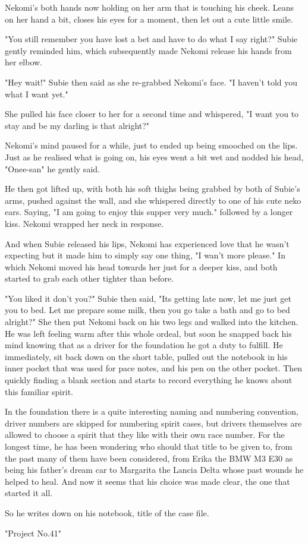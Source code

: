 Nekomi's both hands now holding on her arm that is touching his cheek. Leans on her hand a bit, closes his eyes for a moment, then let out a cute little smile. 

"You still remember you have lost a bet and have to do what I say right?" Subie gently reminded him, which subsequently made Nekomi release his hands from her elbow. 

"Hey wait!" Subie then said as she re-grabbed Nekomi's face. "I haven't told you what I want yet."

She pulled his face closer to her for a second time and whispered, "I want you to stay and be my darling is that alright?"

Nekomi's mind paused for a while, just to ended up being smooched on the lips. Just as he realised what is going on, his eyes went a bit wet and nodded his head, "Onee-san" he gently said. 

He then got lifted up, with both his soft thighs being grabbed by both of Subie's arms, pushed against the wall, and she whispered directly to one of his cute neko ears. Saying, "I am going to enjoy this supper very much." followed by a longer kiss. Nekomi wrapped her neck in response. 

And when Subie released his lips, Nekomi has experienced love that he wasn't expecting but it made him to simply say one thing, "I wan't more please." In which Nekomi moved his head towards her just for a deeper kiss, and both started to grab each other tighter than before. 

"You liked it don't you?" Subie then said, "Its getting late now, let me just get you to bed. Let me prepare some milk, then you go take a bath and go to bed alright?" She then put Nekomi back on his two legs and walked into the kitchen. He was left feeling warm after this whole ordeal, but soon he snapped back his mind knowing that as a driver for the foundation he got a duty to fulfill. He immediately, sit back down on the short table, pulled out the notebook in his inner pocket that was used for pace notes, and his pen on the other pocket. Then quickly finding a blank section and starts to record everything he knows about this familiar spirit. 

In the foundation there is a quite interesting naming and numbering convention, driver numbers are skipped for numbering spirit cases, but drivers themselves are allowed to choose a spirit that they like with their own race number. For the longest time, he has been wondering who should that title to be given to, from the past many of them have been considered, from Erika the BMW M3 E30 as being his father's dream car to Margarita the Lancia Delta whose past wounds he helped to heal. And now it seems that his choice was made clear, the one that started it all. 

So he writes down on his notebook, title of the case file. 

"Project No.41"
